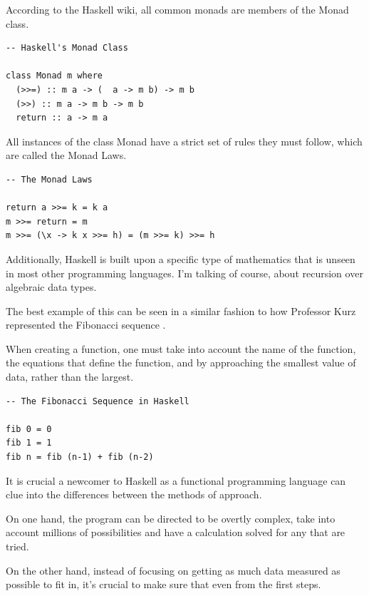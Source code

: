 \documentclass{article}
\begin{document}
\medskip\noindent
According to the Haskell wiki, all common monads are members of the Monad class.

\medskip

\medskip\noindent
\begin{lstlisting}
-- Haskell's Monad Class

class Monad m where
  (>>=) :: m a -> (  a -> m b) -> m b
  (>>) :: m a -> m b -> m b
  return :: a -> m a
\end{lstlisting}

\medskip\noindent
All instances of the class Monad have a strict set of rules they must follow, which are called the Monad Laws\cite{MD}.

\medskip

\medskip\noindent
\begin{lstlisting}
-- The Monad Laws

return a >>= k = k a
m >>= return = m
m >>= (\x -> k x >>= h) = (m >>= k) >>= h 
\end{lstlisting}

\medskip\noindent
Additionally, Haskell is built upon a specific type of mathematics that is unseen in most other programming languages. I'm talking of course, about recursion over algebraic data types. 

\medskip\noindent
The best example of this can be seen in a similar fashion to how Professor Kurz represented the Fibonacci sequence \cite{PL}. 

\medskip\noindent
When creating a function, one must take into account the name of the function, the equations that define the function, and by approaching the smallest value of data, rather than the largest\cite{AK}.

\medskip

\medskip\noindent
\begin{lstlisting}
-- The Fibonacci Sequence in Haskell

fib 0 = 0
fib 1 = 1
fib n = fib (n-1) + fib (n-2)
\end{lstlisting}

\medskip\noindent
It is crucial a newcomer to Haskell as a functional programming language can clue into the differences between the methods of approach.  

\medskip\noindent
On one hand, the program can be directed to be overtly complex, take into account millions of possibilities and have a calculation solved for any that are tried.  

\medskip\noindent
On the other hand, instead of focusing on getting as much data measured as possible to fit in, it's crucial to make sure that even from the first steps.
\end{document}
